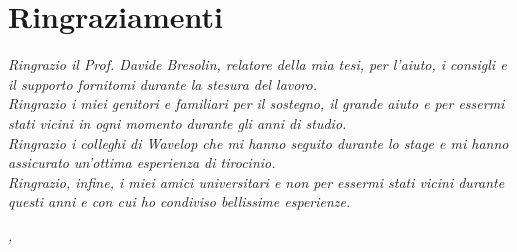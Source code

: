 
\cleardoublepage
{}
{}

\bigskip

\begingroup
\let\clearpage\relax
\let\cleardoublepage\relax
\let\cleardoublepage\relax

\chapter*{Ringraziamenti}

\noindent \textit{Ringrazio il Prof. Davide Bresolin, relatore della mia tesi, per l'aiuto, i consigli e il supporto fornitomi durante la stesura del lavoro.}\\

\noindent \textit{Ringrazio i miei genitori e familiari per il sostegno, il grande aiuto e per essermi stati vicini in ogni momento durante gli anni di studio.}\\

\noindent \textit{Ringrazio i colleghi di Wavelop che mi hanno seguito durante lo stage e mi hanno assicurato un'ottima esperienza di tirocinio.}\\

\noindent \textit{Ringrazio, infine, i miei amici universitari e non per essermi stati vicini durante questi anni e con cui ho condiviso bellissime esperienze.}\\
\bigskip

\noindent\textit{\myLocation, \myTime}
\hfill \myName

\endgroup

